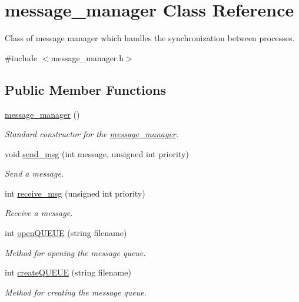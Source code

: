 \hypertarget{classmessage__manager}{}\section{message\+\_\+manager Class Reference}
\label{classmessage__manager}


Class of message manager which handles the synchronization between processes.  




{\ttfamily \#include $<$message\+\_\+manager.\+h$>$}

\subsection*{Public Member Functions}
\begin{DoxyCompactItemize}
\item 
\hyperlink{classmessage__manager_a9db91d8dc6020a4bb525abc218fe09ae}{message\+\_\+manager} ()
\begin{DoxyCompactList}\small\item\em Standard constructor for the \hyperlink{classmessage__manager}{message\+\_\+manager}. \end{DoxyCompactList}\item 
void \hyperlink{classmessage__manager_a1f802ec26eed0834f69988f43f194273}{send\+\_\+msg} (int message, unsigned int priority)
\begin{DoxyCompactList}\small\item\em Send a message. \end{DoxyCompactList}\item 
int \hyperlink{classmessage__manager_a186a0f3b9e4e0a34a26f57f118a9dad7}{receive\+\_\+msg} (unsigned int priority)
\begin{DoxyCompactList}\small\item\em Receive a message. \end{DoxyCompactList}\item 
int \hyperlink{classmessage__manager_a44006bd0a6a168cb40a81dcb1b81aaeb}{open\+Q\+U\+E\+UE} (string filename)
\begin{DoxyCompactList}\small\item\em Method for opening the message queue. \end{DoxyCompactList}\item 
int \hyperlink{classmessage__manager_a63f1f841de93a791c5520f64ff797639}{create\+Q\+U\+E\+UE} (string filename)
\begin{DoxyCompactList}\small\item\em Method for creating the message queue. \end{DoxyCompactList}\item 

\end{DoxyCompactItemize}

